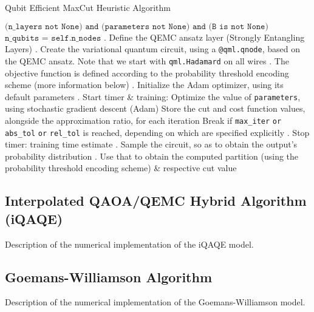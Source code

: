 \begin{algorithm}[H]
   \caption{Qubit Efficient MaxCut Heuristic Algorithm}\label{alg:QEMC}
   \begin{algorithmic}
   \Require $\texttt{(n\_layers not None) and (parameters not None) and (B is not None)}$ 
   \Ensure $\texttt{n\_qubits = self.n\_nodes}$
   . Define the QEMC ansatz layer (Strongly Entangling Layers)
   . Create the variational quantum circuit, using a \texttt{@qml.qnode}, based on the QEMC ansatz. Note that we start with \texttt{qml.Hadamard} on all wires
   . The objective function is defined according to the probability threshold encoding scheme (more information below)
   . Initialize the Adam optimizer, using its default parameters
   . Start timer \& training:
    Optimize the value of \texttt{parameters}, using stochastic gradient descent (Adam)
    Store the cut and cost function values, alongside the approximation ratio, for each iteration
    Break if \texttt{max\_iter} \texttt{or} \texttt{abs\_tol} \texttt{or} \texttt{rel\_tol} is reached, depending on which are specified explicitly
   \EndWhile
   . Stop timer: training time estimate
   . Sample the circuit, so as to obtain the output's probability distribution
   . Use that to obtain the computed partition (using the probability threshold encoding scheme) \& respective cut value
   \end{algorithmic}
\end{algorithm}


\subsection{Interpolated QAOA/QEMC Hybrid Algorithm (iQAQE)}
\label{subsection:iQAQE_Implementation}

Description of the numerical implementation of the iQAQE model.

\subsection{Goemans-Williamson Algorithm}
\label{subsection:Goemans_Williamson_Implementation}

Description of the numerical implementation of the Goemans-Williamson model.

